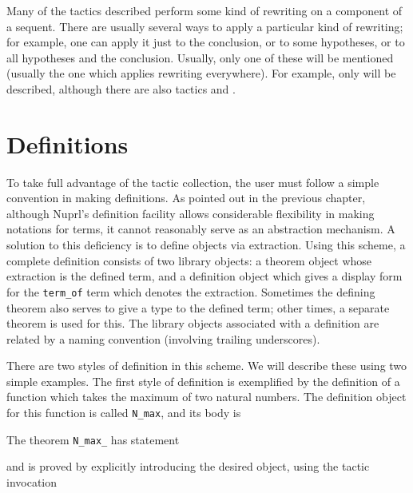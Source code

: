 Many of the tactics described perform some kind of rewriting on a component
of a sequent.  There are usually several ways to apply a particular kind of
rewriting; for example, one can apply it just to the conclusion, or to some
hypotheses, or to all hypotheses and the conclusion.  Usually, only one of
these will be mentioned (usually the one which applies rewriting everywhere).
For example, only  will be described, although there are also tactics
 and .


\section{Definitions}

\label{definitions}

To take full advantage of the tactic collection,
the user must follow a simple convention in making
definitions.  As pointed out in the previous
chapter, although Nuprl's definition facility
allows considerable flexibility in making notations for
terms, it cannot reasonably serve as an abstraction
mechanism.  A solution to this deficiency is to
define objects via extraction.  Using this scheme,
a complete definition consists of two library
objects: a theorem object whose extraction is the
defined term, and a definition object which gives a
display form for the {\tt term\_of} term which
denotes the extraction.  Sometimes the defining
theorem also serves to give a type to the defined
term; other times, a separate theorem is used for
this.  The library objects associated with a
definition are related by a naming convention
(involving trailing underscores).

There are two styles of definition in this scheme.  We will describe
these using two simple examples.  The first style of definition is
exemplified by the definition of a function which takes the maximum of
two natural numbers.  The definition object for this function is
called {\tt N\_max}, and its body is
\begin{Numath}
\end{Numath}%
The theorem {\tt N\_max\_} has statement
\begin{Numath}
\end{Numath}%
and is proved by explicitly introducing the desired object, using the tactic
invocation 
\begin{Numath}
\end{Numath}%

